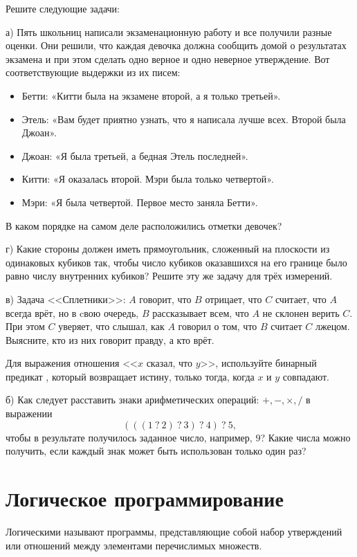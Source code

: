 \begin{Assignment}
Решите следующие задачи:

\medskip
а) Пять школьниц написали экзаменационную работу и все получили разные оценки. Они решили, что каждая девочка должна сообщить домой о результатах экзамена и при этом сделать одно верное и
одно неверное утверждение. Вот соответствующие выдержки из их писем:
\begin{itemize}
  \item Бетти: «Китти была на экзамене второй, а я только третьей».
  \item Этель: «Вам будет приятно узнать, что я написала лучше всех. Второй была Джоан».
  \item Джоан: «Я была третьей, а бедная Этель последней».
  \item Китти: «Я оказалась второй. Мэри была только четвертой».
  \item Мэри: «Я была четвертой. Первое место заняла Бетти».
\end{itemize}
 В каком порядке на самом деле расположились отметки девочек?
 
 \medskip
 г)\label{as:rectangles} Какие стороны должен иметь прямоугольник, сложенный на плоскости из одинаковых кубиков так, чтобы число кубиков оказавшихся на его границе было равно числу внутренних кубиков? Решите эту же задачу для трёх измерений.

  \medskip
 в) Задача <<Сплетники>>: $A$ говорит, что $B$ отрицает, что $C$ считает, что $A$ всегда врёт, но в cвою очередь, $B$ рассказывает всем, что $A$ не склонен верить $C$. При этом $C$ уверяет, что слышал, как $A$ говорил о том, что $B$ считает $C$ лжецом. Выясните, кто из них говорит правду, а кто врёт.
 
 Для выражения отношения <<$x$ сказал, что $y$>>, используйте бинарный предикат , который возвращает истину, только тогда, когда $x$ и $y$ совпадают.

\medskip
 б) Как следует расставить знаки арифметических операций: $+, -, \times, /$ в выражении $$(((1~?~2)~?~3)~?~4)~?~5,$$ чтобы в результате получилось заданное число, например, $9$? Какие числа можно получить, если каждый знак может быть использован только один раз?
\end{Assignment}



\section{Логическое программирование}%
Логическими называют программы, представляющие собой набор утверждений или отношений между элементами перечислимых множеств. 


